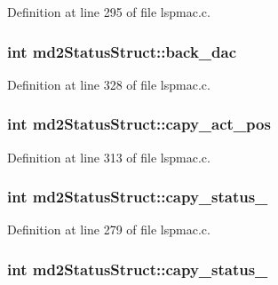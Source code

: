 Definition at line 295 of file lspmac.\-c.

\hypertarget{structmd2StatusStruct_a33ce490348c8de255cf49b96469d3d4e}{
\subsubsection[{back\-\_\-dac}]{\setlength{\rightskip}{0pt plus 5cm}int md2\-Status\-Struct\-::back\-\_\-dac}}\label{structmd2StatusStruct_a33ce490348c8de255cf49b96469d3d4e}


Definition at line 328 of file lspmac.\-c.

\hypertarget{structmd2StatusStruct_ae25122a6db146501b51609b9cb59b044}{
\subsubsection[{capy\-\_\-act\-\_\-pos}]{\setlength{\rightskip}{0pt plus 5cm}int md2\-Status\-Struct\-::capy\-\_\-act\-\_\-pos}}\label{structmd2StatusStruct_ae25122a6db146501b51609b9cb59b044}


Definition at line 313 of file lspmac.\-c.

\hypertarget{structmd2StatusStruct_a7f4e945e80b1980b9e69366a69ad79cc}{
\subsubsection[{capy\-\_\-status\-\_\-1}]{\setlength{\rightskip}{0pt plus 5cm}int md2\-Status\-Struct\-::capy\-\_\-status\-\_}}\label{structmd2StatusStruct_a7f4e945e80b1980b9e69366a69ad79cc}


Definition at line 279 of file lspmac.\-c.

\hypertarget{structmd2StatusStruct_a5d7c10d9a16ebcc53ac4a0770ab2ef62}{
\subsubsection[{capy\-\_\-status\-\_\-2}]{\setlength{\rightskip}{0pt plus 5cm}int md2\-Status\-Struct\-::capy\-\_\-status\-\_}}\label{structmd2StatusStruct_a5d7c10d9a16ebcc53ac4a0770ab2ef62}


